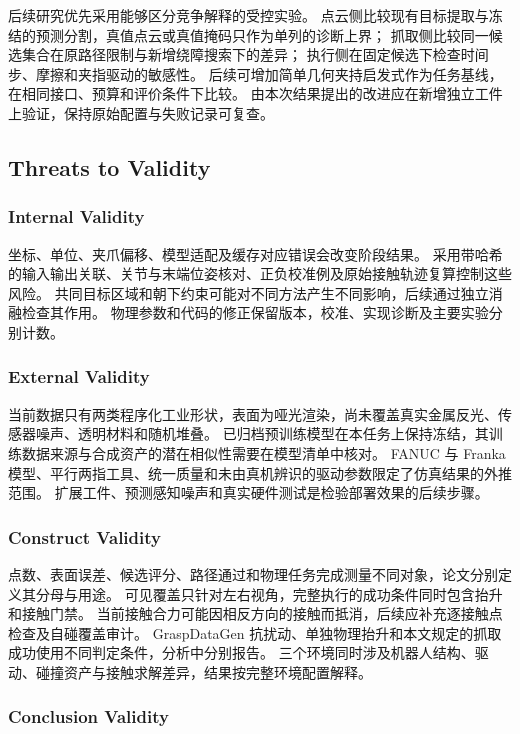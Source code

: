 \documentclass[UTF8,fontset=fandol,a4paper,11pt]{ctexart}
\newcommand{\qyb}[1]{#1}
\begin{document}
后续研究优先采用能够区分竞争解释的受控实验。
点云侧比较现有目标提取与冻结的预测分割，真值点云或真值掩码只作为单列的诊断上界；
抓取侧比较同一候选集合在原路径限制与新增绕障搜索下的差异；
执行侧在固定候选下检查时间步、摩擦和夹指驱动的敏感性。
后续可增加简单几何夹持启发式作为任务基线，在相同接口、预算和评价条件下比较。
由本次结果提出的改进应在新增独立工件上验证，保持原始配置与失败记录可复查。

\subsection{\qyb{Threats to Validity}}
\label{sec:threats}

\subsubsection{Internal Validity}

坐标、单位、夹爪偏移、模型适配及缓存对应错误会改变阶段结果。
采用带哈希的输入输出关联、关节与末端位姿核对、正负校准例及原始接触轨迹复算控制这些风险。
共同目标区域和朝下约束可能对不同方法产生不同影响，后续通过独立消融检查其作用。
物理参数和代码的修正保留版本，校准、实现诊断及主要实验分别计数。

\subsubsection{External Validity}

当前数据只有两类程序化工业形状，表面为哑光渲染，尚未覆盖真实金属反光、传感器噪声、透明材料和随机堆叠。
已归档预训练模型在本任务上保持冻结，其训练数据来源与合成资产的潜在相似性需要在模型清单中核对。
FANUC 与 Franka 模型、平行两指工具、统一质量和未由真机辨识的驱动参数限定了仿真结果的外推范围。
扩展工件、预测感知噪声和真实硬件测试是检验部署效果的后续步骤。

\subsubsection{Construct Validity}

点数、表面误差、候选评分、路径通过和物理任务完成测量不同对象，论文分别定义其分母与用途。
可见覆盖只针对左右视角，完整执行的成功条件同时包含抬升和接触门禁。
当前接触合力可能因相反方向的接触而抵消，后续应补充逐接触点检查及自碰覆盖审计。
GraspDataGen 抗扰动、单独物理抬升和本文规定的抓取成功使用不同判定条件，分析中分别报告。
三个环境同时涉及机器人结构、驱动、碰撞资产与接触求解差异，结果按完整环境配置解释。

\subsubsection{Conclusion Validity}
\end{document}
